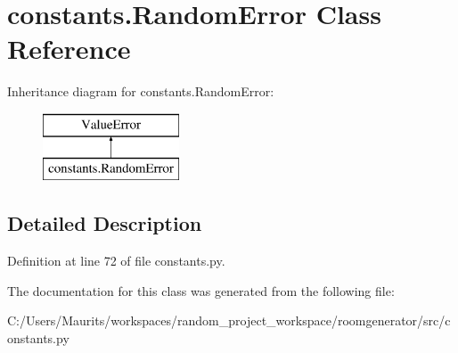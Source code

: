 \hypertarget{classconstants_1_1_random_error}{}\section{constants.\+Random\+Error Class Reference}
\label{classconstants_1_1_random_error}
Inheritance diagram for constants.\+Random\+Error\+:\begin{figure}[H]
\begin{center}
\leavevmode
\includegraphics[height=2.000000cm]{classconstants_1_1_random_error}
\end{center}
\end{figure}


\subsection{Detailed Description}


Definition at line 72 of file constants.\+py.



The documentation for this class was generated from the following file\+:\begin{DoxyCompactItemize}
\item 
C\+:/\+Users/\+Maurits/workspaces/random\+\_\+project\+\_\+workspace/roomgenerator/src/constants.\+py\end{DoxyCompactItemize}
